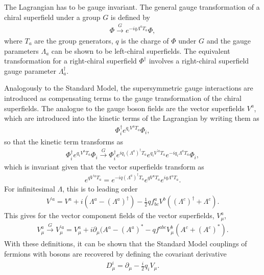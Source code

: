 \documentclass[twoside,english]{uiofysmaster}
\begin{document}
The Lagrangian has to be gauge invariant. The general gauge transformation of a chiral superfield under a group $G$ is defined by
\begin{align}
	\Phi \overset{G}{\to} e^{-iq\Lambda^a T_a}\Phi,
\end{align}
where $T_a$ are the group generators, $q$ is the charge of $\Phi$ under $G$ and the gauge parameters $\Lambda_a$ can be shown to be left-chiral superfields. The equivalent transformation for a right-chiral superfield $\Phi^\dag$ involves a right-chiral superfield gauge parameter $\Lambda_a^\dag$.

Analogously to the Standard Model, the supersymmetric gauge interactions are introduced as compensating terms to the gauge transformation of the chiral superfields. The analogue to the gauge boson fields are the vector superfields $V^a$, which are introduced into the kinetic terms of the Lagrangian by writing them as
\begin{align}
	\Phi^\dag_i e^{q_i V^a T_a}\Phi_i,
\end{align}
so that the kinetic term transforms as
\begin{align}
	\Phi_i^\dag e^{q_i V^a T_a}\Phi_i \overset{G}{\to} \Phi_i^\dag e^{iq_i(\Lambda^a)^\dag T_a}e^{q_iV^{'a}T_a}e^{-iq_i\Lambda^a T_a}\Phi_i,
\end{align}
which is invariant given that the vector superfields transform as
\begin{align}
	e^{qV^{'a} T_a} = e^{-iq(\Lambda^a)^\dag T_a}e^{qV^a T_a}e^{iq\Lambda^a T_a}.
\end{align}
For infinitesimal $\Lambda$, this is to leading order
\begin{align}
	V^{'a} = V^a + i(\Lambda^a - (\Lambda^a)^\dag) - \frac{1}{2}qf^a_{bc} V^b ((\Lambda^c)^\dag + \Lambda^c).
\end{align}
This gives for the vector component fields of the vector superfields, $V_\mu^a$,
\begin{align}
	V^a_\mu \overset{G}{\to} V^{'a}_\mu = V_\mu^a + i\partial_\mu(A^a - (A^a)^* - qf^{abc} V_\mu^b (A^c + (A^{c})^*).
\end{align}
With these definitions, it can be shown that the Standard Model couplings of fermions with bosons are recovered by defining the covariant derivative
\begin{align}
	D_\mu^i = \partial_\mu - \frac{i}{2} q_i V_\mu.
\end{align}
\end{document}

